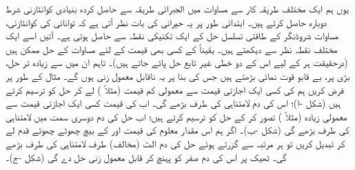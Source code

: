 یوں ہم ایک مختلف طریقہ کار سے مساوات  میں الجبرائی طریقہ سے حاصل کردہ بنیادی کوانٹازنی شرط دوبارہ حاصل کرتے ہیں۔ ابتدائی طور پر یہ حیرانی کی بات نظر آتی ہے کہ توانائی کی کوانٹازنی، مساوات شروڈنگر کے طاقتی تسلسل حل کے ایک تکنیکی نقطہ سے حاصل ہوتی ہے۔ آئیں اسے ایک مختلف نقطہ نظر سے دیکھتے ہیں۔ یقیناً  کے کسی بھی قیمت کے لئے مساوات  کے حل ممکن ہیں (درحقیقت ہر  کے لیے اس کے دو خطی غیر تابع حل پائے جاتے ہیں)۔ تاہم ان میں سے زیادہ تر حل، بڑی  پر، بے قابو قوت نمائی بڑھتے ہیں جس کی بنا پر یہ ناقابل معمول زنی ہوں گے۔ مثال کے طور پر فرض کریں ہم  کی کسی ایک اجازتی قیمت سے معمولی کم قیمت (مثلاً ) لے کر حل کو ترسیم کرتے ہیں (شکل -ا)؛ اس کی دم لامتناہی کی طرف بڑھے گی۔ اب  کی قیمت کسی ایک اجازتی قیمت سے معمولی زیادہ (مثلاً ) تصور کر کے حل کو ترسیم کرتے ہیں؛ اب حل کی دم دوسری سمت میں لامتناہی کی طرف
 بڑھے گی (شکل -ب)۔ اگر ہم اس مقدار معلوم کی قیمت  اور  کے بیچ چھوٹے چھوٹے قدم لے کر تبدیل کریں تو ہر مرتبہ  سے گزرتے ہوئے حل کی دم الٹ (مخالف) طرف لامتناہی کی طرف بڑھے گی۔ ٹھیک  پر اس کی دم صفر کو پہنچ کر قابل معمول زنی حل دے گی (شکل -ج)۔ 

\begin{comment}
the tail flipping figure (Fig 2.6, p67 below) is produced with the octave code (./tex/octave/tailFlipping.m) reproduced below. this code named "tailFlipping.m" produces the data "tailFlipUP.dat" , "tailFlipDN.dat" and "tailFlipNone.dat" which must be placed in the folder "./tex/tables" (as set by "\pgfplotsset{table/search path={./tex/tables},}" in the preamble). Octave must be run independantly to produce this data.

"./tex/octave/tailFlipping.m"
{
vdp = @(t,y) [y(2); (t^2-0.98)*y(1)];
lin=linspace(0,3.75,50);
[t,y] = ode45 (fvdp, lin, [1,0]);
plot(t,y(:,1));

ty=[t,y(:,1)];
save tailFlipUP.dat ty

fvdp = @(t,y) [y(2); (t^2-1.02)*y(1)];
lin=linspace(0,3.75,50);
[t,y] = ode45 (fvdp, lin, [1,0]);
plot(t,y(:,1));

ty=[t,y(:,1)];
save tailFlipDn.dat ty

fvdp = @(t,y) [y(2); (t^2-1)*y(1)];
lin=linspace(0,3.75,50);
[t,y] = ode45 (fvdp, lin, [1,0]);
plot(t,y(:,1));

ty=[t,y(:,1)];
save tailFlipNone.dat ty
}
\end{comment}


